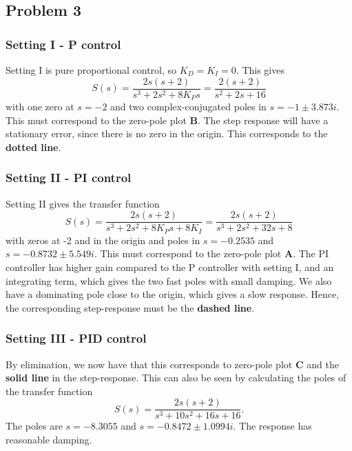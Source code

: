 \documentclass{scrartcl}
\begin{document}
\subsection*{Problem 3}
\label{sec:orgheadline13}
\subsubsection*{Setting I - P control}
\label{sec:orgheadline10}
Setting I is pure proportional control, so \(K_D=K_I=0\). This gives
\[ S(s) = \frac{2s(s+2)}{s^3 + 2s^2 + 8K_Ps} = \frac{2(s+2)}{s^2 + 2s + 16} \]
with one zero at \(s=-2\) and two complex-conjugated poles in \(s = -1 \pm 3.873i\). This must correspond to the zero-pole plot \textbf{B}. The step response will have a stationary error, since there is no zero in the origin. This corresponds to the \textbf{dotted line}.
\subsubsection*{Setting II - PI control}
\label{sec:orgheadline11}
Setting II gives the transfer function
\[ S(s) = \frac{2s(s+2)}{s^3 + 2s^2 + 8K_Ps + 8K_I} = \frac{2s(s+2)}{s^3 + 2s^2 + 32s + 8}\]
with zeros at -2 and in the origin and poles in \(s=-0.2535\) and \(s = -0.8732 \pm 5.549i\). This must correspond to the zero-pole plot \textbf{A}. The PI controller has higher gain compared to the P controller with setting I, and an integrating term, which gives the two fast poles with small damping. We also have a dominating pole close to the origin, which gives a slow response. Hence, the corresponding step-response must be the \textbf{dashed line}.
\subsubsection*{Setting III - PID control}
\label{sec:orgheadline12}
By elimination, we now have that this corresponds to zero-pole plot \textbf{C} and the \textbf{solid line} in the step-response. This can also be seen by calculating the poles of the transfer function
\[ S(s) = \frac{2s(s+2)}{s^3 + 10s^2 + 16s + 16}.\]
The poles are \(s=-8.3055\) and \(s = -0.8472 \pm 1.0994i\). The response has reasonable damping.
\end{document}
